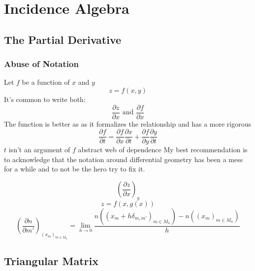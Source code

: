 
\chapter{Incidence Algebra}

\section{The Partial Derivative}

\subsection{Abuse of Notation}
Let $f$ be a function of $x$ and $y$
\[z = f(x,y)\]
It's common to write both:
\[\frac{\partial z}{\partial x}\text{ and }\frac{\partial f}{\partial x}\]
The function is better as as it formalizes the relationship and has a more rigorous 
\[\frac{\partial f}{\partial t} = \frac{\partial f}{\partial x}\frac{\partial x}{\partial t}+\frac{\partial f}{\partial y}\frac{\partial y}{\partial t}\]
$t$ isn't an argument of $f$
abstract web of dependence 
My best recommendation is to acknowledge that the notation around differential geometry has been a mess for a while and to not be the hero try to fix it.

\[\left(\frac{\partial z}{\partial x}\right)_y\]
\[z=f(x,g(x))\]
\[
	\left(\frac{\partial n}{\partial m'}\right)_{(x_m)_{m\in M_n}} =
	\lim_{h\rightarrow 0}\frac{n((x_m+h\delta_{m,m'})_{m\in M_n})-n((x_m)_{m\in M_n})}{h}
\]

\section{Triangular Matrix}
